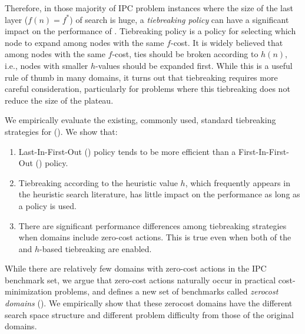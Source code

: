 Therefore, in those majority of IPC problem instances where the size of
the last layer ($f(n)=f^*$) of search is huge, a
\emph{tiebreaking policy} can have a significant impact on the
performance of \astar. Tiebreaking policy is a policy 
for selecting which node to expand among nodes with the same $f$-cost.
It is widely believed that among nodes with the same $f$-cost,
ties should be broken according to $h(n)$, i.e.,
nodes with smaller $h$-values should be expanded first.  While this is a
useful rule of thumb in many domains, it turns out that tiebreaking
requires more careful consideration, particularly for problems where
this tiebreaking does not reduce the size of the plateau.

We empirically evaluate the existing, commonly used, standard
tiebreaking strategies for \astar ().
We show that:

\begin{enumerate}
 \item Last-In-First-Out (\lifo) policy tends to be more efficient
       than a First-In-First-Out (\fifo) policy.
 \item Tiebreaking according to the heuristic value $h$, which
       frequently appears in the heuristic search literature, has little
       impact on the performance as long as a \lifo policy is used.
 \item There are significant performance differences among tiebreaking strategies
       when domains include zero-cost actions. This is true even when
       both of the \lifo and $h$-based tiebreaking are enabled.
\end{enumerate}

While there are relatively few domains with zero-cost actions in the IPC
benchmark set, we argue that zero-cost actions naturally occur in
practical cost-minimization problems, and defines a new set of
benchmarks called \emph{zerocost domains}
().  We empirically show that these
zerocost domains have the different search space structure and different
problem difficulty from those of the original domains.

